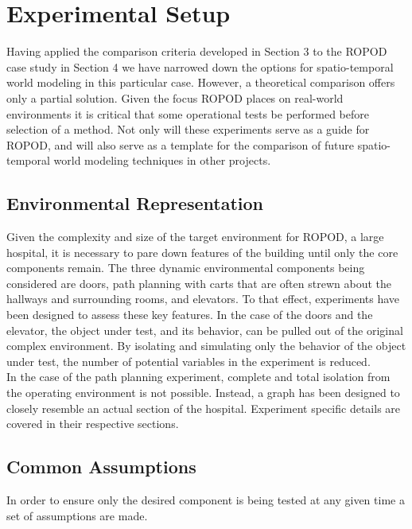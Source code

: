 

  \chapter{Experimental Setup}

  Having applied the comparison criteria developed in Section 3 to the ROPOD case
  study in Section 4 we have narrowed down the options for spatio-temporal
  world modeling in this particular case. However, a theoretical comparison offers
  only a partial solution. Given the focus ROPOD places on real-world
  environments it is critical that some operational tests be performed before
  selection of a method. Not only will these experiments serve as a guide for ROPOD,
  and will also serve as a template for the comparison of future
  spatio-temporal world modeling techniques in other projects. \\

  \section{ Environmental Representation}

  Given the complexity and size of the target environment for ROPOD, a large
  hospital, it is necessary to pare down features of the building until only
  the core components remain. The three dynamic environmental components being
  considered are doors, path planning with carts that are often strewn about the
  hallways and surrounding rooms, and elevators.
  To that effect, experiments have been designed to assess these key features.
  In the case of the doors and the elevator, the object under test, and its
  behavior, can be pulled out of the original complex environment. By
  isolating and simulating only the behavior of the object under test, the
  number of potential variables in the experiment is reduced.\\

  In the case of the path planning experiment, complete and total isolation from the operating
  environment is not possible. Instead, a graph has been designed to closely
  resemble an actual section of the hospital. Experiment specific details are
  covered in their respective sections. \\


  \section{ Common Assumptions }
  In order to ensure only the desired component is being tested at any given
  time a set of assumptions are made.

